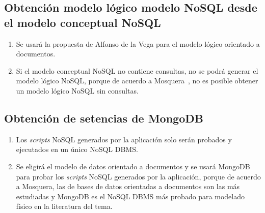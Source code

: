 \subsection*{Obtención modelo lógico modelo NoSQL desde el modelo conceptual NoSQL}
\begin{enumerate}
    \item Se usará la propuesta de Alfonso de la Vega\cite{de_la_vega_mortadelo_2020} para el modelo lógico orientado a documentos.
    \item Si el modelo conceptual NoSQL no contiene consultas, no se podrá generar el modelo lógico NoSQL, porque de acuerdo a Mosquera~\cite{martinez-mosquera_modeling_2020}, no es posible obtener un modelo lógico NoSQL sin consultas.
\end{enumerate}

\subsection*{Obtención de setencias de MongoDB}
\begin{enumerate}
    \item Los \textit{scripts} NoSQL generados por la aplicación solo serán probados y ejecutados en un único NoSQL DBMS.
    \item Se eligirá el modelo de datos orientado a documentos y se usará MongoDB para probar los \textit{scripts} NoSQL generados por la aplicación, porque de acuerdo a Mosquera\cite{martinez-mosquera_modeling_2020}, las de bases de datos orientadas a documentos son las más estudiadas y MongoDB es el NoSQL DBMS más probado para modelado físico en la literatura del tema.
\end{enumerate}
    